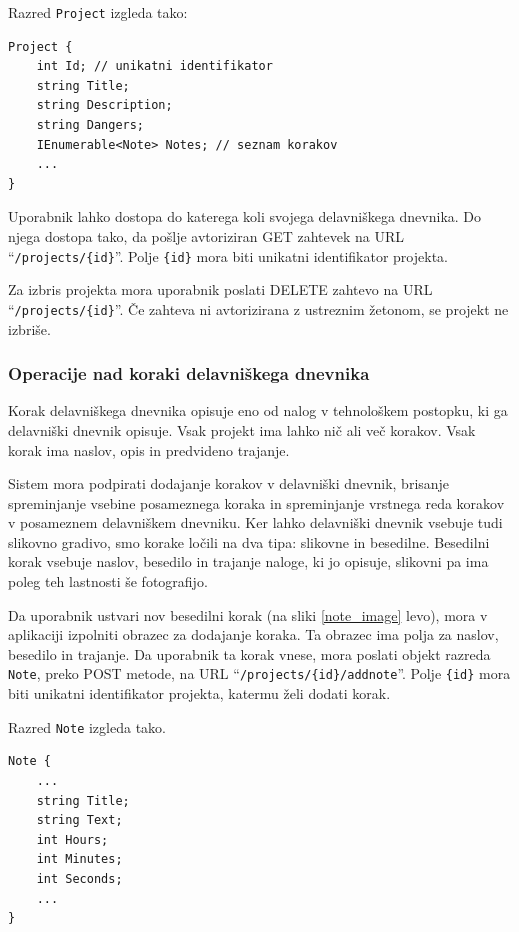 \documentclass[a4paper, 12pt]{book}
\begin{document}
\noindent Razred \texttt{Project} izgleda tako:

\begin{verbatim}
Project { 
    int Id; // unikatni identifikator 
    string Title; 
    string Description; 
    string Dangers; 
    IEnumerable<Note> Notes; // seznam korakov 
    ... 
}
\end{verbatim}

Uporabnik lahko dostopa do katerega koli svojega delavniškega dnevnika.
Do njega dostopa tako, da pošlje avtoriziran GET zahtevek na URL \enquote{\texttt{/projects/\{id\}}}.
Polje \texttt{\{id\}} mora biti unikatni identifikator projekta.

Za izbris projekta mora uporabnik poslati DELETE zahtevo na URL \enquote{\texttt{/projects/\{id\}}}.
Če zahteva ni avtorizirana z ustreznim žetonom, se projekt ne izbriše.

\subsubsection{Operacije nad koraki delavniškega dnevnika}

Korak delavniškega dnevnika opisuje eno od nalog v tehnološkem postopku, ki ga delavniški dnevnik opisuje.
Vsak projekt ima lahko nič ali več korakov.
Vsak korak ima naslov, opis in predvideno trajanje.

Sistem mora podpirati dodajanje korakov v delavniški dnevnik, brisanje spreminjanje vsebine posameznega koraka in spreminjanje vrstnega reda korakov v posameznem delavniškem dnevniku.
Ker lahko delavniški dnevnik vsebuje tudi slikovno gradivo, smo korake ločili na dva tipa: slikovne in besedilne.
Besedilni korak vsebuje naslov, besedilo in trajanje naloge, ki jo opisuje, slikovni pa ima poleg teh lastnosti še fotografijo.


Da uporabnik ustvari nov besedilni korak (na sliki \ref{note_image} levo), mora v aplikaciji izpolniti obrazec za dodajanje koraka.
Ta obrazec ima polja za naslov, besedilo in trajanje.
Da uporabnik ta korak vnese, mora poslati objekt razreda \texttt{Note}, preko POST metode, na URL \enquote{\texttt{/projects/\{id\}/addnote}}.
Polje \texttt{\{id\}} mora biti unikatni identifikator projekta, katermu želi dodati korak.

\noindent Razred \texttt{Note} izgleda tako.

\begin{verbatim}
Note { 
    ... 
    string Title; 
    string Text; 
    int Hours; 
    int Minutes;
    int Seconds;
    ...
}
\end{verbatim}
\end{document}
